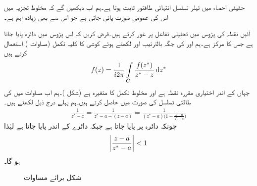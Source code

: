 حقیقی احصاء میں ٹیلر تسلسل انتہائی طاقتور ثابت ہوتا ہے۔ہم اب دیکھیں گے کہ مخلوط تجزیہ میں اس کی عمومی صورت پائی جاتی ہے جو اس سے بھی زیادہ اہم ہے۔

آئیں نقطہ  کی پڑوس میں تحلیلی تفاعل  پر غور کرتے ہیں۔فرض کریں کہ اس پڑوس میں دائرہ  پایا جاتا ہے جس کا مرکز  ہے۔ہم  اور  کی جگہ بالترتیب  اور  لکھتے ہوئے  کوشی کا کلیہ تکمل (مساوات ) استعمال کرتے ہیں
\begin{align}\label{مساوات_ٹیلر_کوشی_کلیہ_تکمل_ٹیلر_الف}
f(z)=\frac{1}{i2\pi}\int\limits_C\frac{f(z^*)}{z^*-z}\dif z^*
\end{align}
جہاں  کے اندر  اختیاری مقررہ نقطہ ہے اور  مخلوط تکمل کا متغیرہ ہے (شکل )۔ہم اب مساوات  میں  کی طاقتی تسلسل  کی صورت میں حاصل کرتے ہیں۔ہم پہلے درج ذیل لکھتے ہیں۔
\begin{align}\label{مساوات_ٹیلر_کوشی_کلیہ_تکمل_ٹیلر_ب}
\frac{1}{z^*-z}=\frac{1}{z^*-a-(z-a)}=\frac{1}{(z^*-a)\big(1-\frac{z-a}{z^*-a}\big)}
\end{align}
چونکہ  دائرہ  پر پایا جاتا ہے جبکہ  دائرے کے اندر پایا جاتا ہے لہٰذا
\begin{align}\label{مساوات_ٹیلر_کوشی_کلیہ_تکمل_ٹیلر_پ}
\abs{\frac{z-a}{z^*-a}}<1
\end{align}
ہو گا۔
\begin{figure}
\centering
{}
\caption{شکل برائے مساوات }
\label{شکل_مساوات_ٹیلر_کوشی_کلیہ_تکمل_ٹیلر_الف}
\end{figure}

